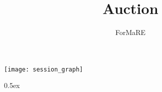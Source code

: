 \documentclass[10pt,a4paper]{article}
\begin{document}
\title{Auction}
\author{ForMaRE}
\maketitle

\tableofcontents

\begin{center}
  \texttt{[image: session\_graph]}
\end{center}

\parindent 0pt\parskip 0.5ex



%
%
\end{document}
